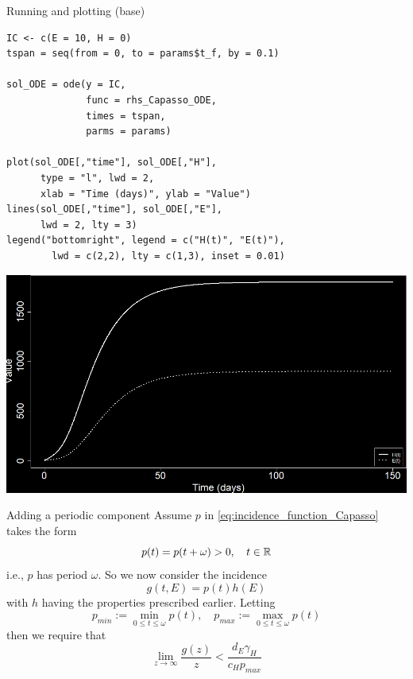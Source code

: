 \documentclass[aspectratio=169]{beamer}
\begin{document}
\begin{frame}[fragile]{Running and plotting (base)}
\begin{lstlisting}
IC <- c(E = 10, H = 0)
tspan = seq(from = 0, to = params$t_f, by = 0.1)

sol_ODE = ode(y = IC,
              func = rhs_Capasso_ODE,
              times = tspan,
              parms = params)

plot(sol_ODE[,"time"], sol_ODE[,"H"],
      type = "l", lwd = 2,
      xlab = "Time (days)", ylab = "Value")
lines(sol_ODE[,"time"], sol_ODE[,"E"], 
      lwd = 2, lty = 3)
legend("bottomright", legend = c("H(t)", "E(t)"),
        lwd = c(2,2), lty = c(1,3), inset = 0.01)
\end{lstlisting}
\end{frame}

\begin{frame}
  \begin{center}
    \includegraphics[width=\textwidth]{../FIGS/Capasso_ETP_1}
  \end{center}
\end{frame}



\begin{frame}{Adding a periodic component}
  Assume $p$ in \eqref{eq:incidence_function_Capasso} takes the form 
  \begin{equation}
    p(t)=p(t+\omega)>0,\quad t\in\mathbb{R}
  \end{equation}
  i.e., $p$ has period $\omega$. So we now consider the incidence
  \begin{equation}
    \label{eq:incidence_Capasso_periodic}
    g(t,E)=p(t)h(E)
  \end{equation}
  with $h$ having the properties prescribed earlier.
  Letting 
  \begin{equation}
    p_{min} := \min_{0\leq t\leq\omega}p(t),\quad
    p_{max} := \max_{0\leq t\leq\omega}p(t)
  \end{equation}
  then we require that 
  \begin{equation}
    \lim_{z\to\infty}\frac{g(z)}{z}<\frac{d_E\gamma_H}{c_Hp_{max}}
  \end{equation}
\end{frame}
\end{document}
